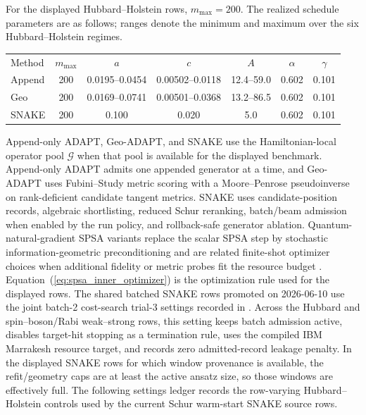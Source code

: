 \documentclass[
  reprint,
  amsmath,
  amssymb,
  aps,
  pra,
  nofootinbib,
  superscriptaddress,
  floatfix
]{revtex4-2}
\newcommand{\Gset}{\mathcal{G}}
\begin{document}
For the displayed Hubbard--Holstein rows, \(m_{\max}=200\). The realized
schedule parameters are as follows; ranges denote the minimum and maximum over
the six Hubbard--Holstein regimes.
\begin{center}
\scriptsize
\setlength{\tabcolsep}{1.4pt}
\renewcommand{\arraystretch}{1.05}
\begin{ruledtabular}
\begin{tabular}{lcccccc}
Method & \(m_{\max}\) & \(a\) & \(c\) & \(A\) & \(\alpha\) & \(\gamma\)\\
\colrule
Append & 200 & 0.0195--0.0454 & 0.00502--0.0118 & 12.4--59.0 & 0.602 & 0.101\\
Geo & 200 & 0.0169--0.0741 & 0.00501--0.0368 & 13.2--86.5 & 0.602 & 0.101\\
SNAKE & 200 & 0.100 & 0.020 & 5.0 & 0.602 & 0.101\\
\end{tabular}
\end{ruledtabular}
\end{center}
Append-only ADAPT, Geo-ADAPT, and SNAKE use the Hamiltonian-local operator pool
\(\Gset\) when that pool is available for the displayed benchmark. Append-only
ADAPT admits one appended generator at a time, and Geo-ADAPT uses Fubini--Study
metric scoring with a
Moore--Penrose pseudoinverse on rank-deficient candidate tangent metrics. SNAKE
uses candidate-position records, algebraic shortlisting, reduced Schur
reranking, batch/beam admission when enabled by the run policy, and rollback-safe
generator ablation. Quantum-natural-gradient SPSA variants replace the scalar
SPSA step by stochastic information-geometric preconditioning and are related
finite-shot optimizer choices when additional fidelity or metric probes fit the
resource budget \cite{Gacon2021QNSPSA,Stokes2020QNG}. Equation~(\ref{eq:spsa_inner_optimizer})
is the optimization rule used for the displayed rows. The shared batched SNAKE
rows promoted on 2026-06-10 use the joint batch-2 cost-search trial-3 settings
recorded in .
Across the Hubbard and spin--boson/Rabi weak--strong rows, this setting keeps
batch admission active, disables target-hit stopping as a termination rule,
uses the compiled IBM Marrakesh resource target, and records zero admitted-record
leakage penalty. In the displayed SNAKE rows for which window provenance is available, the refit/geometry caps are at least the active ansatz size, so those windows are effectively full. The following settings ledger records the row-varying Hubbard--Holstein controls used by the current Schur warm-start SNAKE source rows.
\end{document}
